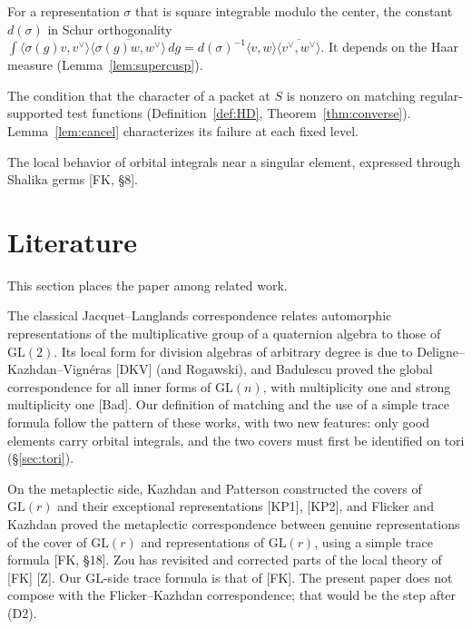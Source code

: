 \documentclass[12pt]{article}
\newcommand{\ov}[1]{\overline{#1}}
\newcommand{\GL}{\mathrm{GL}}
\theoremstyle{plain}
\theoremstyle{definition}
\begin{document}
\begin{description}[style=nextline,leftmargin=1.5em]
\item[Formal degree.] For a representation $\sigma$ that is square integrable modulo the center, the constant $d(\sigma)$ in Schur orthogonality $\int\langle\sigma(g)v,v^\vee\rangle\ov{\langle\sigma(g)w,w^\vee\rangle}\,dg=d(\sigma)^{-1}\langle v,w\rangle\ov{\langle v^\vee,w^\vee\rangle}$. It depends on the Haar measure (Lemma~\ref{lem:supercusp}).
\item[Elliptic detectability, $(\mathrm H_D)$, (H).] The condition that the character of a packet at $S$ is nonzero on matching regular-supported test functions (Definition~\ref{def:HD}, Theorem~\ref{thm:converse}). Lemma~\ref{lem:cancel} characterizes its failure at each fixed level.
\item[Germ.] The local behavior of orbital integrals near a singular element, expressed through Shalika germs [FK, \S8].
\end{description}

\section{Literature}\label{sec:lit}
This section places the paper among related work.

The classical Jacquet--Langlands correspondence relates automorphic representations of the multiplicative group of a quaternion algebra to those of $\GL(2)$. Its local form for division algebras of arbitrary degree is due to Deligne--Kazhdan--Vign\'eras [DKV] (and Rogawski), and Badulescu proved the global correspondence for all inner forms of $\GL(n)$, with multiplicity one and strong multiplicity one [Bad]. Our definition of matching and the use of a simple trace formula follow the pattern of these works, with two new features: only good elements carry orbital integrals, and the two covers must first be identified on tori (\S\ref{sec:tori}).

On the metaplectic side, Kazhdan and Patterson constructed the covers of $\GL(r)$ and their exceptional representations [KP1], [KP2], and Flicker and Kazhdan proved the metaplectic correspondence between genuine representations of the cover of $\GL(r)$ and representations of $\GL(r)$, using a simple trace formula [FK, \S18]. Zou has revisited and corrected parts of the local theory of [FK] [Z]. Our $\GL$-side trace formula is that of [FK]. The present paper does not compose with the Flicker--Kazhdan correspondence; that would be the step after (D2).
\end{document}
